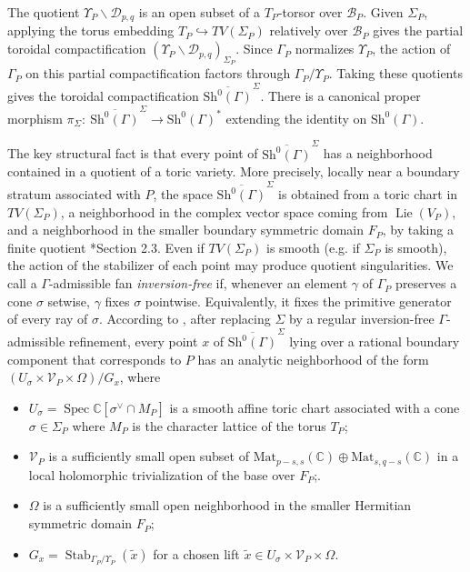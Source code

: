 \documentclass[11pt]{amsart}
\theoremstyle{plain}
\theoremstyle{definition}
\numberwithin{equation}{section}
\def\Lie{\mathop{\mathrm{Lie}}\nolimits}
\def\Spec{\mathop{\mathrm{Spec}}\nolimits}
\def\Stab{\mathop{\mathrm{Stab}}\nolimits}
\newcommand{\bbC}{\mathbb{C}}
\newcommand{\Mat}{\mathrm{Mat}}
\begin{document}
The quotient $\Upsilon_P\backslash\mathcal D_{p,q}$
is an open subset of a $T_P$-torsor over $\mathcal B_P$.
Given $\Sigma_P$, applying the torus embedding
$T_P\hookrightarrow TV(\Sigma_P)$ relatively over
$\mathcal B_P$ gives the partial toroidal compactification
$(\Upsilon_P\backslash\mathcal D_{p,q})_{\Sigma_P}$.
Since $\Gamma_P$ normalizes $\Upsilon_P$,
the action of $\Gamma_P$ on this partial compactification
factors through $\Gamma_P/\Upsilon_P$.
Taking these quotients gives the toroidal
compactification
$\overline{\mathrm{Sh}^0(\Gamma)}^\Sigma$.
There is a canonical proper morphism
  $\pi_{\Sigma}:\ \overline{\mathrm{Sh}^0(\Gamma)}^{\Sigma}\to \mathrm{Sh}^0(\Gamma)^*$
extending the identity on $\mathrm{Sh}^0(\Gamma)$.

The key structural fact is that every point of $\overline{\mathrm{Sh}^0(\Gamma)}^{\Sigma}$ has a neighborhood contained in a quotient of a toric
variety. More precisely, locally near a boundary stratum associated with $P$,
the space $\overline{\mathrm{Sh}^0(\Gamma)}^{\Sigma}$ is obtained
from a toric chart in $TV(\Sigma_P)$, a neighborhood in the complex
vector space
coming from $\Lie(V_P)$, and a neighborhood in the
smaller boundary symmetric domain $F_P$, by taking a finite quotient \cite{kasparian2021toroidal}*{Section 2.3}. 
Even if $TV(\Sigma_P)$ is smooth (e.g. if $\Sigma_P$ is smooth), the action of the stabilizer of each point may
produce quotient singularities.
We call a $\Gamma$-admissible fan \emph{inversion-free} if,
whenever an element $\gamma$ of $\Gamma_P$ preserves a cone
$\sigma$ setwise, 
$\gamma$ fixes $\sigma$ pointwise.
Equivalently, it fixes the primitive generator of every ray of
$\sigma$.
According to \cites{ash2010smooth,tai1982kodaira}, after replacing $\Sigma$ by a regular inversion-free
$\Gamma$-admissible refinement, every point $x$ 
of $\overline{\mathrm{Sh}^0(\Gamma)}^{\Sigma}$ lying over a rational boundary component that corresponds to $P$ has an analytic neighborhood of the form $(U_{\sigma}\times \mathcal V_P\times \Omega)/G_x$,
where
\begin{itemize}
    \item $U_{\sigma} = \Spec \bbC[\sigma^\vee\cap M_P]$ is a smooth affine toric chart associated with a cone $\sigma\in \Sigma_P$ where $M_P$ is the character lattice of the torus $T_P$;
    \item $\mathcal V_P$ is a sufficiently small open subset of
$\Mat_{p-s,s}(\bbC)\oplus\Mat_{s,q-s}(\bbC)$
in a local holomorphic trivialization of the base over $F_P$;.
    \item $\Omega$ is a sufficiently small open neighborhood in the smaller Hermitian
    symmetric domain $F_P$;
\item $G_x = \Stab_{\Gamma_P/\Upsilon_P}(\widetilde{x})$ for a chosen lift $\widetilde{x}\in U_{\sigma}\times \mathcal V_P\times \Omega$.
    \end{itemize}
\end{document}

